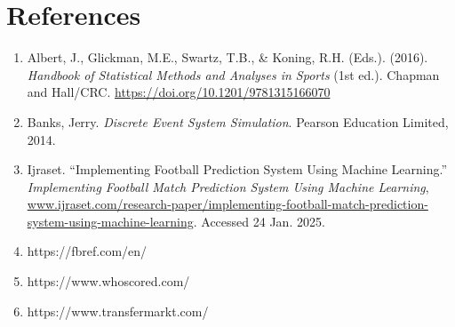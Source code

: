 \documentclass[12pt]{article}
\begin{document}
\section{References}
\begin{enumerate}
    \item Albert, J., Glickman, M.E., Swartz, T.B., \& Koning, R.H. (Eds.). (2016). \textit{Handbook of Statistical Methods and Analyses in Sports} (1st ed.). Chapman and Hall/CRC. \url{https://doi.org/10.1201/9781315166070}
    \item Banks, Jerry. \textit{Discrete Event System Simulation}. Pearson Education Limited, 2014.
    \item Ijraset. “Implementing Football Prediction System Using Machine Learning.” \textit{Implementing Football Match Prediction System Using Machine Learning}, \url{www.ijraset.com/research-paper/implementing-football-match-prediction-system-using-machine-learning}. Accessed 24 Jan. 2025.
    \item https://fbref.com/en/
    \item https://www.whoscored.com/
    \item https://www.transfermarkt.com/
\end{enumerate}
\end{document}
